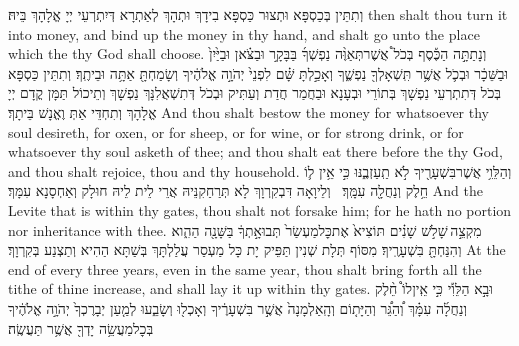 {וְתִתֵּין בְּכַסְפָּא וּתְצוּר כַּסְפָּא בִידָךְ וּתְהָךְ לְאַתְרָא דְּיִתְרְעֵי יְיָ אֱלָהָךְ בֵּיהּ׃}
{then shalt thou turn it into money, and bind up the money in thy hand, and shalt go unto the place which the \lord\space thy God shall choose.}{}
{וְנָתַתָּ֣ה הַכֶּ֡סֶף בְּכֹל֩ אֲשֶׁר\maqqaf תְּאַוֶּ֨ה נַפְשְׁךָ֜ בַּבָּקָ֣ר וּבַצֹּ֗אן וּבַיַּ֙יִן֙ וּבַשֵּׁכָ֔ר וּבְכֹ֛ל אֲשֶׁ֥ר תִּֽשְׁאָלְךָ֖ נַפְשֶׁ֑ךָ וְאָכַ֣לְתָּ שָּׁ֗ם לִפְנֵי֙ יְהֹוָ֣ה אֱלֹהֶ֔יךָ וְשָׂמַחְתָּ֖ אַתָּ֥ה וּבֵיתֶֽךָ׃}
{וְתִתֵּין כַּסְפָּא בְּכֹל דְּתִתְרְעֵי נַפְשָׁךְ בְּתוֹרֵי וּבְעָנָא וּבַחֲמַר חֲדַת וְעַתִּיק וּבְכֹל דְּתִשְׁאֲלִנָּךְ נַפְשָׁךְ וְתֵיכוֹל תַּמָּן קֳדָם יְיָ אֱלָהָךְ וְתִחְדֵּי אַתְּ וֶאֱנָשׁ בֵּיתָךְ׃}
{And thou shalt bestow the money for whatsoever thy soul desireth, for oxen, or for sheep, or for wine, or for strong drink, or for whatsoever thy soul asketh of thee; and thou shalt eat there before the \lord\space thy God, and thou shalt rejoice, thou and thy household.}{}
{וְהַלֵּוִ֥י אֲשֶׁר\maqqaf בִּשְׁעָרֶ֖יךָ לֹ֣א תַֽעַזְבֶ֑נּוּ כִּ֣י אֵ֥ין ל֛וֹ חֵ֥לֶק וְנַחֲלָ֖ה עִמָּֽךְ׃ \setuma }
{וְלֵיוָאָה דִּבְקִרְוָךְ לָא תְּרַחַקִנֵּיהּ אֲרֵי לֵית לֵיהּ חוּלָק וְאַחְסָנָא עִמָּךְ׃}
{And the Levite that is within thy gates, thou shalt not forsake him; for he hath no portion nor inheritance with thee.}{}
{מִקְצֵ֣ה \legarmeh  שָׁלֹ֣שׁ שָׁנִ֗ים תּוֹצִיא֙ אֶת\maqqaf כׇּל\maqqaf מַעְשַׂר֙ תְּבוּאָ֣תְךָ֔ בַּשָּׁנָ֖ה הַהִ֑וא וְהִנַּחְתָּ֖ בִּשְׁעָרֶֽיךָ׃}
{מִסּוֹף תְּלָת שְׁנִין תַּפֵּיק יָת כָּל מַעְסַר עֲלַלְתָּךְ בְּשַׁתָּא הַהִיא וְתַצְנַע בְּקִרְוָךְ׃}
{At the end of every three years, even in the same year, thou shalt bring forth all the tithe of thine increase, and shall lay it up within thy gates.}{}
{וּבָ֣א הַלֵּוִ֡י כִּ֣י אֵֽין\maqqaf לוֹ֩ חֵ֨לֶק וְנַחֲלָ֜ה עִמָּ֗ךְ וְ֠הַגֵּ֠ר וְהַיָּת֤וֹם וְהָֽאַלְמָנָה֙ אֲשֶׁ֣ר בִּשְׁעָרֶ֔יךָ וְאָכְל֖וּ וְשָׂבֵ֑עוּ לְמַ֤עַן יְבָרֶכְךָ֙ יְהֹוָ֣ה אֱלֹהֶ֔יךָ בְּכׇל\maqqaf מַעֲשֵׂ֥ה יָדְךָ֖ אֲשֶׁ֥ר תַּעֲשֶֽׂה׃ \setuma }
